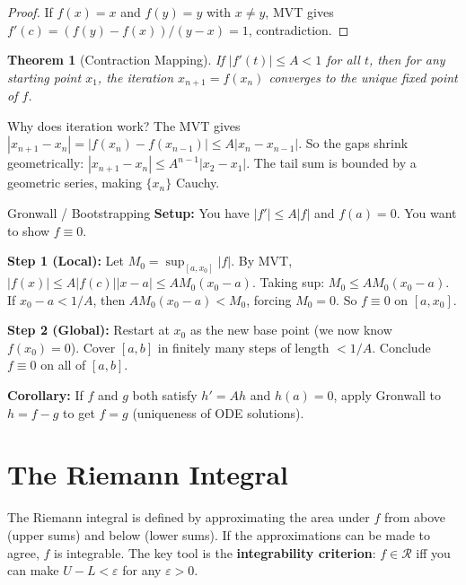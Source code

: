 \documentclass[11pt]{article}
\newcommand{\eps}{\varepsilon}
\theoremstyle{myplain}
\newtheorem{theorem}{Theorem}[section]
\theoremstyle{definition}
\theoremstyle{remark}
\begin{document}
\begin{proof}
If $f(x) = x$ and $f(y) = y$ with $x \neq y$, MVT gives $f'(c) = (f(y)-f(x))/(y-x) = 1$, contradiction.
\end{proof}

\begin{theorem}[Contraction Mapping]
If $|f'(t)| \leq A < 1$ for all $t$, then for any starting point $x_1$, the iteration $x_{n+1} = f(x_n)$ converges to the unique fixed point of $f$.
\end{theorem}

\begin{insight}
Why does iteration work? The MVT gives $|x_{n+1} - x_n| = |f(x_n) - f(x_{n-1})| \leq A|x_n - x_{n-1}|$. So the gaps shrink geometrically: $|x_{n+1} - x_n| \leq A^{n-1}|x_2 - x_1|$. The tail sum is bounded by a geometric series, making $\{x_n\}$ Cauchy.
\end{insight}

\begin{technique}{Gronwall / Bootstrapping}
\textbf{Setup:} You have $|f'| \leq A|f|$ and $f(a) = 0$. You want to show $f \equiv 0$.

\textbf{Step 1 (Local):} Let $M_0 = \sup_{[a,x_0]}|f|$. By MVT, $|f(x)| \leq A|f(c)||x-a| \leq AM_0(x_0 - a)$. Taking sup: $M_0 \leq AM_0(x_0 - a)$. If $x_0 - a < 1/A$, then $AM_0(x_0-a) < M_0$, forcing $M_0 = 0$. So $f \equiv 0$ on $[a, x_0]$.

\textbf{Step 2 (Global):} Restart at $x_0$ as the new base point (we now know $f(x_0) = 0$). Cover $[a,b]$ in finitely many steps of length $< 1/A$. Conclude $f \equiv 0$ on all of $[a,b]$.

\textbf{Corollary:} If $f$ and $g$ both satisfy $h' = A h$ and $h(a) = 0$, apply Gronwall to $h = f - g$ to get $f = g$ (uniqueness of ODE solutions).
\end{technique}

\section{The Riemann Integral}

\begin{bigpicture}
The Riemann integral is defined by approximating the area under $f$ from above (upper sums) and below (lower sums). If the approximations can be made to agree, $f$ is integrable. The key tool is the \textbf{integrability criterion}: $f \in \mathscr{R}$ iff you can make $U - L < \eps$ for any $\eps > 0$.
\end{bigpicture}
\end{document}
